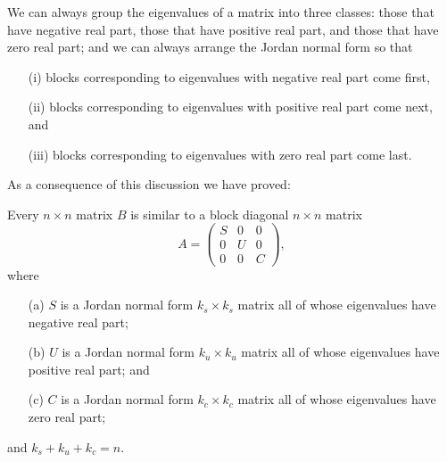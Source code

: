 \documentclass{ximera}
\begin{document}
We can always group the eigenvalues of a matrix into three classes: those 
that have negative real part, 
those that have positive real part, 
and those that have zero real part; and 
we can always arrange the Jordan normal form so 
that 
\begin{itemize}
\item[(i)] blocks corresponding to eigenvalues with negative real part come first,
\item[(ii)] blocks corresponding to eigenvalues with positive real part come 
next, and
\item[(iii)] blocks corresponding to eigenvalues with zero real part come last.
\end{itemize}
As a consequence of this discussion we have proved:
\begin{prop}  \label{P:SUC}
Every $n\times n$ matrix $B$ is similar to a 
block diagonal $n\times n$ matrix
\begin{equation} \label{e:SUC}
A = \left(\begin{array}{ccc} S & 0 & 0 \\ 0 & U & 0\\ 0 & 0 & C \end{array}
\right),
\end{equation}
where
\begin{itemize}
\item[(a)]	$S$ is a Jordan normal form
$k_s\times k_s$ matrix all of whose eigenvalues have negative real part;
\item[(b)]	$U$ is a Jordan normal form $k_u\times k_u$ matrix all
of whose eigenvalues have positive real part; and
\item[(c)]	$C$ is a Jordan normal form $k_c\times k_c$ matrix all
of whose eigenvalues have zero real part;
\end{itemize}
and $k_s+k_u+k_c=n$.
\end{prop}
\end{document}
